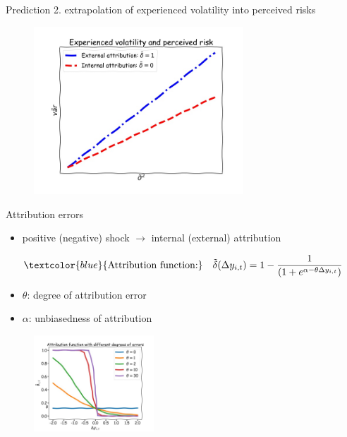 \documentclass{beamer}
\begin{document}
\begin{frame}{Prediction 2. extrapolation of experienced volatility into perceived risks}
	\begin{figure}
		\centering 
		\label{var_experience_var}
		\includegraphics[width=0.7\textwidth]{figures/var_experience_var.jpg}
	\end{figure}
\end{frame}



\begin{frame}{Attribution errors}
	\begin{itemize}
		\item positive (negative) shock $\rightarrow$ internal (external) attribution
	\end{itemize}
	\begin{eqnarray}
\begin{split}
\textcolor{blue}{\text{Attribution function:}} \quad \tilde \delta(\Delta y_{i,t}) = 1- \frac{1}{(1+e^{\alpha-\theta\Delta y_{i,t}})}
\end{split}
\end{eqnarray}
	\begin{itemize}
	\item $\theta$: degree of attribution error
	\item $\alpha$: unbiasedness of attribution
\end{itemize}

	
	\begin{figure}
		\centering 
		\label{var_experience_var}
		\includegraphics[width=0.4\textwidth]{figures/theta_corr.jpg}
	\end{figure}
\end{frame}
\end{document}
